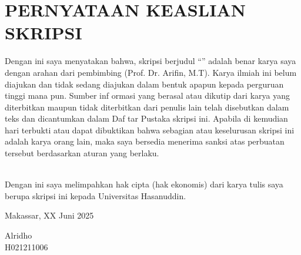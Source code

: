 \begingroup
\singlespacing
\chapter*{PERNYATAAN KEASLIAN SKRIPSI}
\noindent
Dengan ini saya menyatakan bahwa, skripsi berjudul “\textbf{\JudulSkripsi}”
adalah benar karya saya dengan arahan dari pembimbing (Prof. Dr.
Arifin, M.T). Karya ilmiah ini belum diajukan dan tidak sedang
diajukan dalam bentuk apapun kepada perguruan tinggi mana pun. Sumber
inf ormasi yang berasal atau dikutip dari karya yang diterbitkan
maupun tidak diterbitkan dari penulis lain telah disebutkan dalam
teks dan dicantumkan dalam Daf tar Pustaka skripsi ini. Apabila di
kemudian hari terbukti atau dapat dibuktikan bahwa sebagian atau
keselurusan skripsi ini adalah karya orang lain, maka saya bersedia
menerima sanksi atas perbuatan tersebut berdasarkan aturan yang berlaku. \par

\noindent
\\
Dengan ini saya melimpahkan hak cipta (hak ekonomis) dari karya tulis
saya berupa skripsi ini kepada Universitas Hasanuddin. \par

\vspace{2cm}

\hfill
\begin{minipage}{0.4\textwidth}
  \raggedleft
  Makassar, XX Juni 2025 \par
  \vspace{2cm}
  Alridho \\
  H021211006
\end{minipage}
\endgroup
